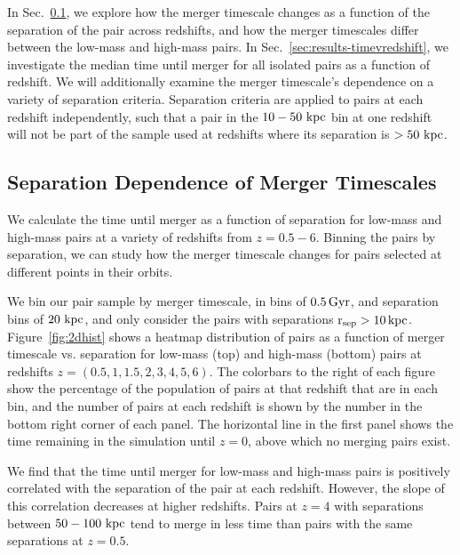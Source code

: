 \documentclass[twocolumn,linenumbers]{aastex631}
\begin{document}
    In Sec.~\ref{sec:results-timevsep}, we explore how the merger timescale changes as a function of the separation of the pair across redshifts, and how the merger timescales differ between the low-mass and high-mass pairs. 
    In Sec.~\ref{sec:results-timevredshift}, we investigate the median time until merger for all isolated pairs as a function of redshift. 
    We will additionally examine the merger timescale's dependence on a variety of separation criteria. 
    Separation criteria are applied to pairs at each redshift independently, such that a pair in the $10-50\,\mathrm{\,kpc}$ bin at one redshift will not be part of the sample used at redshifts where its separation is $>50\,\mathrm{\,kpc}$.



\subsection{Separation Dependence of Merger Timescales}\label{sec:results-timevsep}
    We calculate the time until merger as a function of separation for low-mass and high-mass pairs at a variety of redshifts from $z=0.5-6$. 
    Binning the pairs by separation, we can study how the merger timescale changes for pairs selected at different points in their orbits. 
    
    We bin our pair sample by merger timescale, in bins of $0.5\mathrm{\,Gyr}$, and separation bins of $20\,\mathrm{\,kpc}$, and only consider the pairs with separations $\rm r_{sep}>10\mathrm{\,kpc}$.
    Figure~\ref{fig:2dhist} shows a heatmap distribution of pairs as a function of merger timescale vs. separation for low-mass (top) and high-mass (bottom) pairs at redshifts $z=(0.5,1,1.5,2,3,4,5,6)$. 
    The colorbars to the right of each figure show the percentage of the population of pairs at that redshift that are in each bin, and the number of pairs at each redshift is shown by the number in the bottom right corner of each panel.
    The horizontal line in the first panel shows the time remaining in the simulation until $z=0$, above which no merging pairs exist.
    
    We find that the time until merger for low-mass and high-mass pairs is positively correlated with the separation of the pair at each redshift. 
    However, the slope of this correlation decreases at higher redshifts. 
    Pairs at $z=4$ with separations between $50-100\,\mathrm{\,kpc}$ tend to merge in less time than pairs with the same separations at $z=0.5$. 
    
\end{document}
